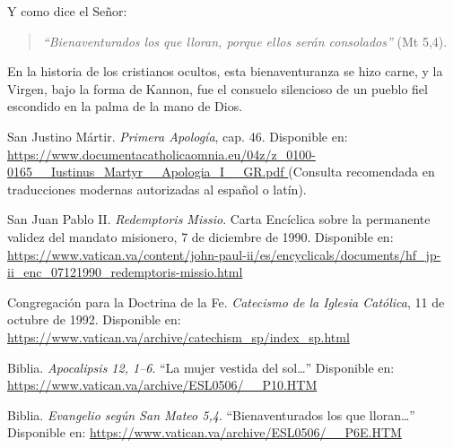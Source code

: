 \documentclass[12pt,a4paper]{article}
\begin{document}
	Y como dice el Señor:
	
	\begin{quote}
		\textit{``Bienaventurados los que lloran, porque ellos serán consolados''} (Mt 5,4).
	\end{quote}
	
	En la historia de los cristianos ocultos, esta bienaventuranza se hizo carne, y la Virgen, bajo la forma de Kannon, fue el consuelo silencioso de un pueblo fiel escondido en la palma de la mano de Dios.
	
	\newpage
	
	\begin{thebibliography}{9}
		
		San Justino Mártir. \emph{Primera Apología}, cap. 46.  
		Disponible en: \url{https://www.documentacatholicaomnia.eu/04z/z_0100-0165__Iustinus_Martyr__Apologia_I__GR.pdf }  
		(Consulta recomendada en traducciones modernas autorizadas al español o latín).
		
		San Juan Pablo II. \emph{Redemptoris Missio}. Carta Encíclica sobre la permanente validez del mandato misionero, 7 de diciembre de 1990.  
		Disponible en: \url{https://www.vatican.va/content/john-paul-ii/es/encyclicals/documents/hf_jp-ii_enc_07121990_redemptoris-missio.html }
		
		Congregación para la Doctrina de la Fe. \emph{Catecismo de la Iglesia Católica}, 11 de octubre de 1992.  
		Disponible en: \url{https://www.vatican.va/archive/catechism_sp/index_sp.html }
		
		Biblia. \emph{Apocalipsis 12, 1–6}.  
		“La mujer vestida del sol…”  
		Disponible en: \url{https://www.vatican.va/archive/ESL0506/__P10.HTM }
		
		Biblia. \emph{Evangelio según San Mateo 5,4}.  
		“Bienaventurados los que lloran…”  
		Disponible en: \url{https://www.vatican.va/archive/ESL0506/__P6E.HTM }
		
	\end{thebibliography}
	
\end{document}
